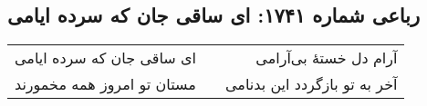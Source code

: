\begin{center}
\section*{رباعی شماره ۱۷۴۱: ای ساقی جان که سرده ایامی}
\label{sec:1741}
\begin{longtable}{l p{0.5cm} r}
ای ساقی جان که سرده ایامی
&&
آرام دل خستهٔ بی‌آرامی
\\
مستان تو امروز همه مخمورند
&&
آخر به تو بازگردد این بدنامی
\\
\end{longtable}
\end{center}
